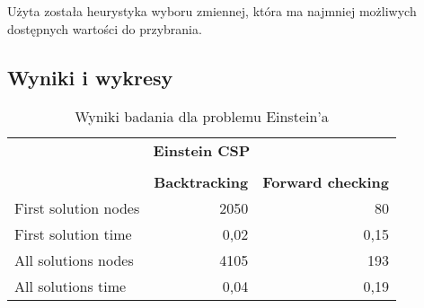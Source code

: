 \documentclass[12pt,a4paper]{article}
\begin{document}
Użyta została heurystyka wyboru zmiennej, która ma najmniej możliwych dostępnych wartości do przybrania.
\subsection{Wyniki i wykresy}
\begin{table}[htbp]
  \centering
    \begin{tabular}{lrr}
    \multicolumn{3}{c}{\textbf{Einstein CSP}} \\
          &       &  \\
          & \multicolumn{1}{c}{\textbf{Backtracking}} & \multicolumn{1}{c}{\textbf{Forward checking}} \\
    First solution nodes & 2050  & 80 \\
    First solution time & 0,02  & 0,15 \\
    All solutions nodes & 4105  & 193 \\
    All solutions time & 0,04  & 0,19 \\
    \end{tabular}%
  \caption{Wyniki badania dla problemu Einstein'a}
  \label{tab:addlabel}%
\end{table}%
\end{document}
